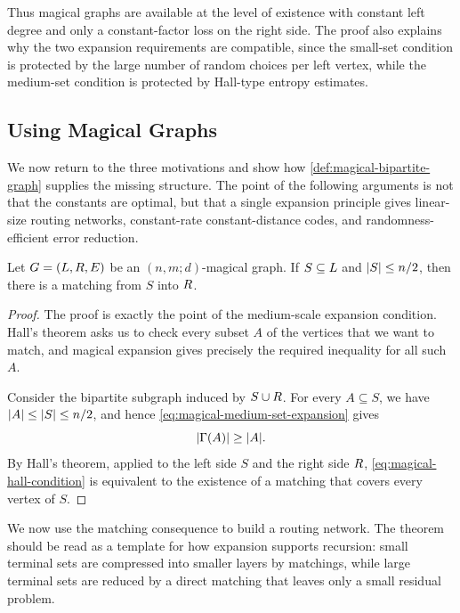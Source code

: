 Thus magical graphs are available at the level of existence with constant left degree and only a constant-factor loss on the right side. The proof also explains why the two expansion requirements are compatible, since the small-set condition is protected by the large number of random choices per left vertex, while the medium-set condition is protected by Hall-type entropy estimates.

\subsection{Using Magical Graphs}
\label{subsec:using-magical-graphs}

We now return to the three motivations and show how \cref{def:magical-bipartite-graph} supplies the missing structure. The point of the following arguments is not that the constants are optimal, but that a single expansion principle gives linear-size routing networks, constant-rate constant-distance codes, and randomness-efficient error reduction.

\begin{lemma}
	\label{lem:magical-hall-matching}
	Let \(G=(L,R,E)\) be an \((n,m;d)\)-magical graph. If \(S\subseteq L\) and \(\lvert S\rvert\leq n/2\), then there is a matching from \(S\) into \(R\).
\end{lemma}

\begin{proof}
	The proof is exactly the point of the medium-scale expansion condition. Hall's theorem asks us to check every subset \(A\) of the vertices that we want to match, and magical expansion gives precisely the required inequality for all such \(A\).

	Consider the bipartite subgraph induced by \(S\cup R\). For every \(A\subseteq S\), we have \(\lvert A\rvert\leq\lvert S\rvert\leq n/2\), and hence \cref{eq:magical-medium-set-expansion} gives
	\begin{equation}
		\label{eq:magical-hall-condition}
		\lvert\Gamma(A)\rvert\geq \lvert A\rvert.
	\end{equation}
	By Hall's theorem, applied to the left side \(S\) and the right side \(R\), \cref{eq:magical-hall-condition} is equivalent to the existence of a matching that covers every vertex of \(S\).
\end{proof}

We now use the matching consequence to build a routing network. The theorem should be read as a template for how expansion supports recursion: small terminal sets are compressed into smaller layers by matchings, while large terminal sets are reduced by a direct matching that leaves only a small residual problem.

